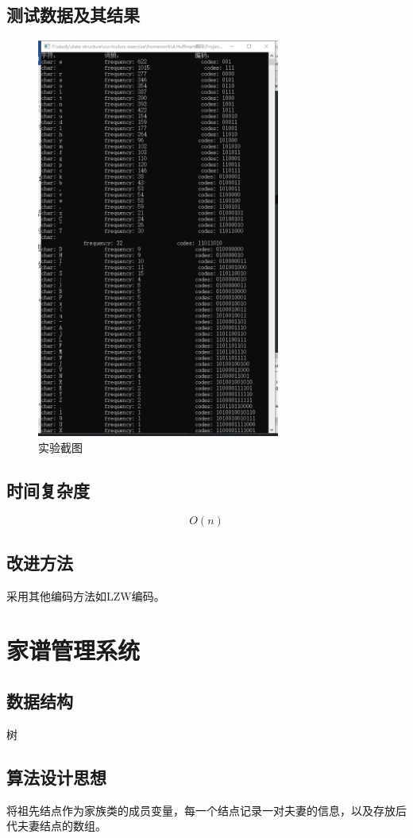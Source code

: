 \documentclass[a4paper,11pt,UTF8]{ctexart}
\begin{document}
\subsection{测试数据及其结果}
\begin{figure}[htbp] %
    \centering
    \includegraphics[width=8cm]{4.png}
    \caption{实验截图}
\end{figure}
\newpage
\subsection{时间复杂度}
$$O(n)$$

\subsection{改进方法}
采用其他编码方法如LZW编码。

\section{家谱管理系统}
\subsection{数据结构}
树
\subsection{算法设计思想}
将祖先结点作为家族类的成员变量，每一个结点记录一对夫妻的信息，以及存放后代夫妻结点的数组。
\end{document}
